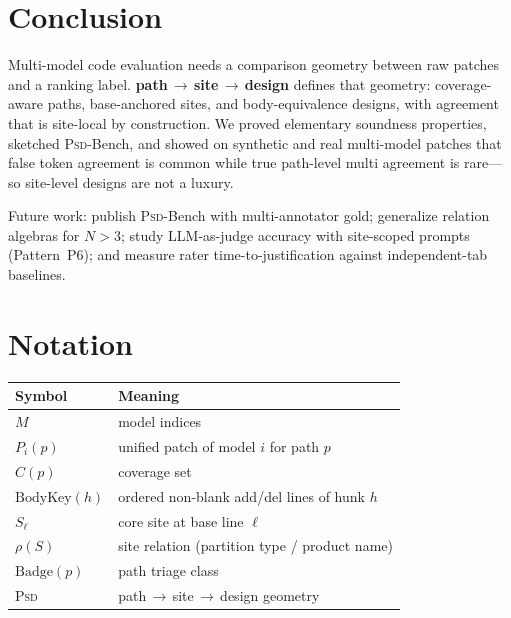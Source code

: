 \documentclass[
  11pt,
  a4paper,
  oneside,
  numbers=noenddot,
  abstract=true,
  headings=normal,
  DIV=11,
  BCOR=0mm,
]{scrartcl}
\theoremstyle{definition}
\theoremstyle{plain}
\theoremstyle{remark}
\newcommand{\PathSiteDesign}{\textbf{path\,$\rightarrow$\,site\,$\rightarrow$\,design}}
\newcommand{\PSD}{\textsc{Psd}}
\newcommand{\BodyKey}{\mathrm{BodyKey}}
\newcommand{\Badge}{\mathrm{Badge}}
\begin{document}
\section{Conclusion}
\label{sec:conclusion}

Multi-model code evaluation needs a comparison geometry between raw
patches and a ranking label. \PathSiteDesign{} defines that geometry:
coverage-aware paths, base-anchored sites, and body-equivalence designs,
with agreement that is site-local by construction. We proved elementary
soundness properties, sketched \PSD{}-Bench, and showed on synthetic and
real multi-model patches that false token agreement is common while true
path-level multi agreement is rare---so site-level designs are not a
luxury.

Future work: publish \PSD{}-Bench with multi-annotator gold; generalize
relation algebras for $N{>}3$; study LLM-as-judge accuracy with site-scoped
prompts (Pattern~P6); and measure rater time-to-justification against
independent-tab baselines.

\section*{Notation}

\begin{center}
\begin{tabular}{@{}ll@{}}
\toprule
\textbf{Symbol} & \textbf{Meaning} \\
\midrule
$M$ & model indices \\
$P_i(p)$ & unified patch of model $i$ for path $p$ \\
$C(p)$ & coverage set \\
$\BodyKey(h)$ & ordered non-blank add/del lines of hunk $h$ \\
$S_\ell$ & core site at base line $\ell$ \\
$\rho(S)$ & site relation (partition type / product name) \\
$\Badge(p)$ & path triage class \\
\PSD{} & path\,$\rightarrow$\,site\,$\rightarrow$\,design geometry \\
\bottomrule
\end{tabular}
\end{center}
\end{document}
